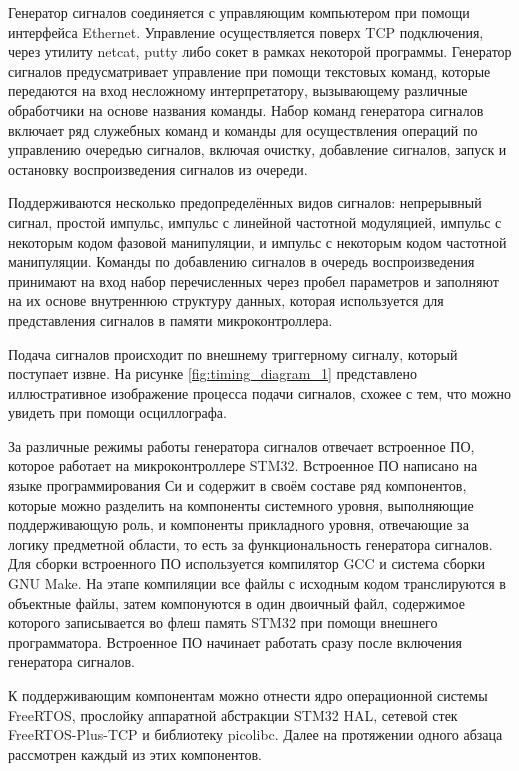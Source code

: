 \documentclass{report}
\begin{document}

Генератор сигналов соединяется с управляющим компьютером при помощи интерфейса Ethernet. Управление осуществляется поверх TCP подключения, через утилиту netcat, putty либо сокет в рамках некоторой программы. Генератор сигналов предусматривает управление при помощи текстовых команд, которые передаются на вход несложному интерпретатору, вызывающему различные обработчики на основе названия команды. Набор команд генератора сигналов включает ряд служебных команд и команды для осуществления операций по управлению очередью сигналов, включая очистку, добавление сигналов, запуск и остановку воспроизведения сигналов из очереди.

Поддерживаются несколько предопределённых видов сигналов: непрерывный сигнал, простой импульс, импульс с линейной частотной модуляцией, импульс с некоторым кодом фазовой манипуляции, и импульс с некоторым кодом частотной манипуляции. Команды по добавлению сигналов в очередь воспроизведения принимают на вход набор перечисленных через пробел параметров и заполняют на их основе внутреннюю структуру данных, которая используется для представления сигналов в памяти микроконтроллера.

Подача сигналов происходит по внешнему триггерному сигналу, который поступает извне. На рисунке \ref{fig:timing_diagram_1} представлено иллюстративное изображение процесса подачи сигналов, схожее с тем, что можно увидеть при помощи осциллографа.


За различные режимы работы генератора сигналов отвечает встроенное ПО, которое работает на микроконтроллере STM32. Встроенное ПО написано на языке программирования Си и содержит в своём составе ряд компонентов, которые можно разделить на компоненты системного уровня, выполняющие поддерживающую роль, и компоненты прикладного уровня, отвечающие за логику предметной области, то есть за функциональность генератора сигналов. Для сборки встроенного ПО используется компилятор GCC и система сборки GNU Make. На этапе компиляции все файлы с исходным кодом транслируются в объектные файлы, затем компонуются в один двоичный файл, содержимое которого записывается во флеш память STM32 при помощи внешнего программатора. Встроенное ПО начинает работать сразу после включения генератора сигналов.

К поддерживающим компонентам можно отнести ядро операционной системы FreeRTOS, прослойку аппаратной абстракции STM32 HAL, сетевой стек FreeRTOS-Plus-TCP и библиотеку picolibc. Далее на протяжении одного абзаца рассмотрен каждый из этих компонентов.
\end{document}
